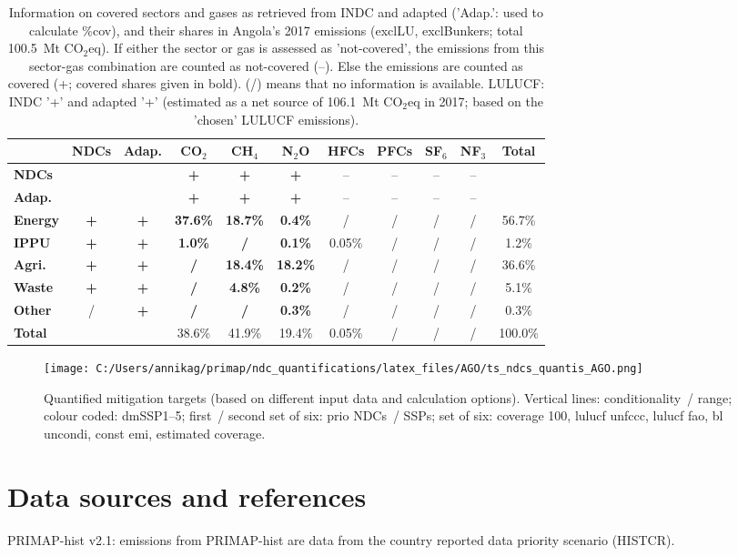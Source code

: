 \documentclass[12pt]{article}
\begin{document}
 \begin{table}[htbp]\small
 \centering
 \caption{Information on covered sectors and gases as retrieved from INDC and adapted ('Adap.': used to calculate \%cov), and their shares in Angola's 2017 emissions (exclLU, exclBunkers; total 100.5~Mt CO$_2$eq).
 If either the sector or gas is assessed as 'not-covered', the emissions from this sector-gas combination are counted as not-covered (--). 
 Else the emissions are counted as covered (+; covered shares given in bold).
 (/) means that no information is available.
 LULUCF: INDC '+' and adapted '+' (estimated as a net source of 106.1~Mt CO$_2$eq in 2017; based on the 'chosen' LULUCF emissions).}
 \label{tab:coveredSectorsGases}
 \begin{tabular}{l || c c || c c c c c c c | c}
 \bfseries  & \bfseries NDCs & \bfseries Adap. & \bfseries CO$_2$ & \bfseries CH$_4$ & \bfseries N$_2$O & \bfseries HFCs & \bfseries PFCs & \bfseries SF$_6$ & \bfseries NF$_3$ & \bfseries Total \tabularnewline \hline \hline
 \bfseries NDCs &  &  & \bfseries + & \bfseries + & \bfseries + & -- & -- & -- & -- &  \tabularnewline 
 \bfseries Adap. &  &  & \bfseries + & \bfseries + & \bfseries + & -- & -- & -- & -- &  \tabularnewline \hline \hline
 \bfseries Energy & \bfseries + & \bfseries + & \bfseries 37.6\% & \bfseries 18.7\% & \bfseries 0.4\% & / & / & / & / & 56.7\% \tabularnewline 
 \bfseries IPPU & \bfseries + & \bfseries + & \bfseries 1.0\% & \bfseries / & \bfseries 0.1\% & 0.05\% & / & / & / & 1.2\% \tabularnewline 
 \bfseries Agri. & \bfseries + & \bfseries + & \bfseries / & \bfseries 18.4\% & \bfseries 18.2\% & / & / & / & / & 36.6\% \tabularnewline 
 \bfseries Waste & \bfseries + & \bfseries + & \bfseries / & \bfseries 4.8\% & \bfseries 0.2\% & / & / & / & / & 5.1\% \tabularnewline 
 \bfseries Other & / & \bfseries + & \bfseries / & \bfseries / & \bfseries 0.3\% & / & / & / & / & 0.3\% \tabularnewline \hline
 \bfseries Total &  &  & 38.6\% & 41.9\% & 19.4\% & 0.05\% & / & / & / & 100.0\% \tabularnewline 
 \end{tabular}
 \end{table}
 \begin{figure}[htbp]
 \centering
 \texttt{[image: C:/Users/annikag/primap/ndc\_quantifications/latex\_files/AGO/ts\_ndcs\_quantis\_AGO.png]}
 \caption{Quantified mitigation targets (based on different input data and calculation options).
 Vertical lines: conditionality~/ range;
 colour coded: dmSSP1--5;
 first~/ second set of six: prio NDCs~/ SSPs;
 set of six: coverage 100, lulucf unfccc, lulucf fao, bl uncondi, const emi, estimated coverage.}
 \label{fig:miti}
 \end{figure}

 \section{Data sources and references}
 \label{sec:dataSourcesRefs}
 PRIMAP-hist v2.1: emissions from PRIMAP-hist are data from the country reported data priority scenario (HISTCR).

 
\end{document}

